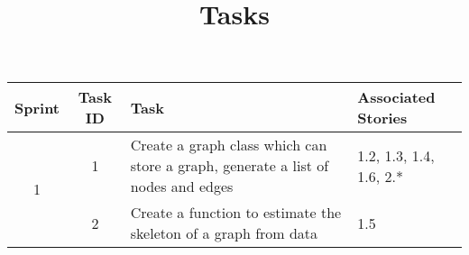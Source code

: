 \documentclass{article}
\begin{document}
	\title{Tasks}
	\date{}
	\maketitle
	\begin{tabular}{| c | c | p{5cm} | l |}
	\hline
	Sprint & Task ID & Task & Associated Stories \\
	\hline
	\multirow{5}{*}{1}
	& 1 & Create a graph class which can store a graph, generate a list of nodes and edges &  1.2, 1.3, 1.4, 1.6, 2.*\\
	\cline{2-4}
	& 2 &  Create a function to estimate the skeleton of a graph from data & 1.5\\
	\hline
	
	\end{tabular}
\end{document}
